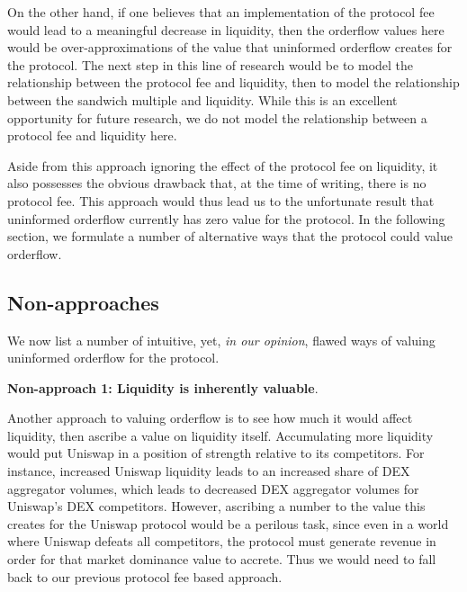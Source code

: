     On the other hand, if one believes that an implementation of the protocol fee would lead to a meaningful decrease in liquidity, then the orderflow values here would be over-approximations of the value that uninformed orderflow creates for the protocol. The next step in this line of research would be to model the relationship between the protocol fee and liquidity, then to model the relationship between the sandwich multiple and liquidity. While this is an excellent opportunity for future research, we do not model the relationship between a protocol fee and liquidity here.

    Aside from this approach ignoring the effect of the protocol fee on liquidity, it also possesses the obvious drawback that, at the time of writing, there is no protocol fee. This approach would thus lead us to the unfortunate result that uninformed orderflow currently has zero value for the protocol. In the following section, we formulate a number of alternative ways that the protocol could value orderflow.

\subsection{Non-approaches}
    We now list a number of intuitive, yet, \textit{in our opinion}, flawed ways of valuing uninformed orderflow for the protocol. 

    \textbf{Non-approach 1: Liquidity is inherently valuable}.

    Another approach to valuing orderflow is to see how much it would affect liquidity, then ascribe a value on liquidity itself. Accumulating more liquidity would put Uniswap in a position of strength relative to its competitors. For instance, increased Uniswap liquidity leads to an increased share of DEX aggregator volumes, which leads to decreased DEX aggregator volumes for Uniswap's DEX competitors. However, ascribing a number to the value this creates for the Uniswap protocol would be a perilous task, since even in a world where Uniswap defeats all competitors, the protocol must generate revenue in order for that market dominance value to accrete. Thus we would need to fall back to our previous protocol fee based approach.


